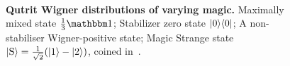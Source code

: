 \documentclass[pra,
aps,
twocolumn,
superscriptaddress,
groupedaddress,
nofootinbib,
reprint
]{revtex4-1}
\begin{document}
\begin{figure}[t]
    \centering
    \hspace{8pt}%
    \\
    \hspace{8pt}%
    \caption{\textbf{Qutrit Wigner distributions of varying magic.} 
     Maximally mixed state $\frac{1}{3}\id$;  Stabilizer zero state $|0\rangle\langle0|$;  A non-stabiliser Wigner-positive state;  Magic Strange state $\ket{{\rm{S}}} = \frac{1}{\sqrt{2}}(\ket{1} - \ket{2})$, coined in~\cite{cit:veitch2}.
    }%
    \label{fig:wstate_examples}
\end{figure}

\null\newpage
\end{document}
